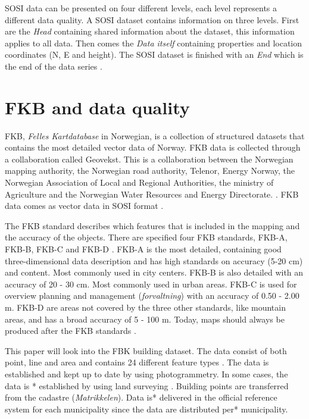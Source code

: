 SOSI data can be presented on four different levels, each level represents a different data quality. %
A SOSI dataset contains information on three levels. First are the \textit{Head} containing shared information about the dataset, this information applies to all data. Then comes the \textit{Data itself} containing properties and location coordinates (N, E and height). The SOSI dataset is finished with an \textit{End} which is the end of the data series \cite{Skogseth2014}.  

\section{FKB and data quality}\label{sec:FKB_quality}

FKB, \textit{Felles Kartdatabase} in Norwegian, is a collection of structured datasets that contains the most detailed vector data of Norway. FKB data is collected through a collaboration called Geovekst. This is a collaboration between the Norwegian mapping authority, the Norwegian road authority, Telenor, Energy Norway, the Norwegian Association of Local and Regional Authorities, the ministry of Agriculture and the Norwegian Water Resources and Energy Directorate. \cite{Kartverketc}. FKB data comes as vector data in SOSI format \cite{Kartverket2011}. 

The FKB standard describes which features that is included in the mapping and the accuracy of the objects. There are specified four FKB standards, FKB-A, FKB-B, FKB-C and FKB-D \cite{Kartverket2011}. FKB-A is the most detailed, containing good three-dimensional data description and has high standards on accuracy (5-20 cm) and content. Most commonly used in city centers. FKB-B is also detailed with an accuracy of 20 - 30 cm. Most commonly used in urban areas. FKB-C is used for overview planning and management (\textit{forvaltning}) with an accuracy of 0.50 - 2.00 m. FKB-D are areas not covered by the three other standards, like mountain areas, and has a broad accuracy of 5 - 100 m. %
Today, maps should always be produced after the FKB standards \cite{Skogseth2014}.

This paper will look into the FBK building dataset. The data consist of both point, line and area and contains 24 different feature types \cite{Kartverket2013}. The data is established and kept up to date by using photogrammetry. In some cases, the data is * %
established by using land surveying \cite{Kartverket2013a}. Building points are transferred from the cadastre (\textit{Matrikkelen}). Data is* %
 delivered in the official reference system for each municipality since the data are distributed per* %
  municipality. 
  
